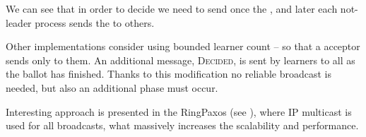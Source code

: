 We can see that in order to decide we need to send once the \propose[], and later each not-leader process sends the \accept to others.

Other implementations consider using bounded learner count -- so that a acceptor sends \accept only to them. An additional message, \textsc{Decided}, is sent by learners to all as the ballot has finished. Thanks to this modification no reliable broadcast is needed, but also an additional phase must occur.

Interesting approach is presented in the RingPaxos (see \cite{Mar10}), where IP multicast is used for all broadcasts, what massively increases the scalability and performance.
